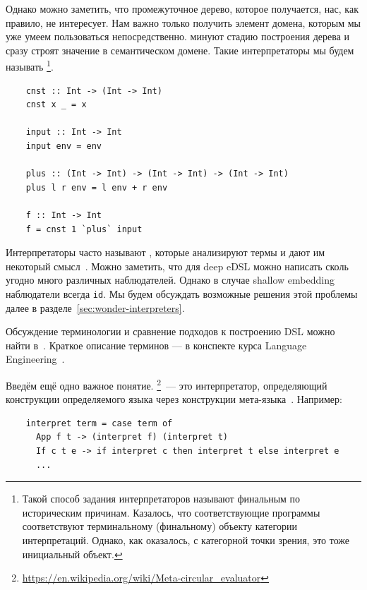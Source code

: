 %

Однако можно заметить, что промежуточное дерево, которое получается, нас, как правило, не интересует.
Нам важно только получить элемент домена, которым мы уже умеем пользоваться непосредственно.
 минуют стадию построения дерева и сразу строят значение в семантическом домене.
Такие интерпретаторы мы будем называть \footnote{Такой способ задания интерпретаторов называют финальным по историческим причинам. Казалось, что соответствующие программы соответствуют терминальному (финальному) объекту категории интерпретаций. Однако, как оказалось, с категорной точки зрения, это тоже инициальный объект.}.
\begin{verbatim}
    cnst :: Int -> (Int -> Int)
    cnst x _ = x

    input :: Int -> Int
    input env = env

    plus :: (Int -> Int) -> (Int -> Int) -> (Int -> Int)
    plus l r env = l env + r env

    f :: Int -> Int
    f = cnst 1 `plus` input
\end{verbatim}

Интерпретаторы часто называют , которые анализируют термы и дают им некоторый смысл~\cite{gibbons2013functional}.
Можно заметить, что для deep eDSL можно написать сколь угодно много различных наблюдателей.
Однако в случае shallow embedding наблюдатели всегда \texttt{id}.
Мы будем обсуждать возможные решения этой проблемы далее в разделе~\ref{sec:wonder-interpreters}.

Обсуждение терминологии и сравнение подходов к построению DSL можно найти в~\cite{gibbons2013functional}.
Краткое описание терминов --- в конспекте курса Language Engineering~\cite{languageEngineering}.

Введём ещё одно важное понятие.
\footnote{\url{https://en.wikipedia.org/wiki/Meta-circular_evaluator}}~--- это интерпретатор, определяющий конструкции определяемого языка через конструкции мета-языка~\cite{reynolds1972definitional}.
Например:
\begin{verbatim}
    interpret term = case term of
      App f t -> (interpret f) (interpret t)
      If c t e -> if interpret c then interpret t else interpret e
      ...
\end{verbatim}

